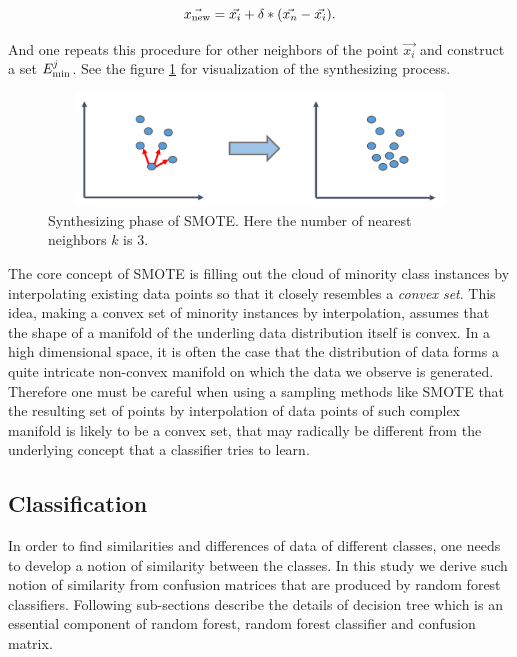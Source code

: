 \documentclass{article}
\begin{document}
		\begin{equation}
		\vec{x_{\rm{new}}} = \vec{x_{i}} + \delta*(\vec{x_{n}} - \vec{x_{i}}).
		\end{equation}

And one repeats this procedure for other neighbors of the point $\vec{x_i}$ and construct a set $E_{\rm{min}}^j$. See the figure \ref{smote} for visualization of the synthesizing process.	
		
		\begin{figure}[ht]
		\begin{center}
		\vspace{0.5cm}
		\includegraphics[clip,width=12cm,height = 3cm]{figs/SMOTE.png}
		\vspace{0.5cm}
		\caption{Synthesizing phase of SMOTE. Here the number of nearest neighbors $k$ is 3.}
		\label{smote}
		\end{center}
		\end{figure}
		

The core concept of SMOTE is filling out the cloud of minority class instances by interpolating existing data points so that it closely resembles a \textit{convex set}. This idea, making a convex set of minority instances by interpolation, assumes that the shape of a manifold of the underling data distribution itself is convex. In a high dimensional space, it is often the case that the distribution of data forms a quite intricate non-convex manifold on which the data we observe is generated. Therefore one must be careful when using a sampling methods like SMOTE that the resulting set of points by interpolation of data points of such complex manifold is likely to be a convex set, that may radically be different from the underlying concept that a classifier tries to learn.

	\subsection{Classification}
	In order to find similarities and differences of data of different classes, one needs to develop a notion of similarity between the classes. In this study we derive such notion of similarity from confusion matrices that are produced by random forest classifiers. Following sub-sections describe the details of decision tree which is an essential component of random forest, random forest classifier and confusion matrix.
	
\end{document}
